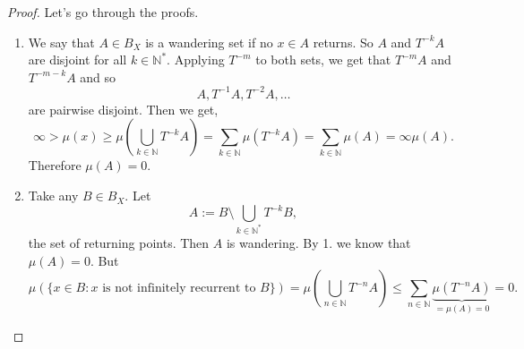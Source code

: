 \documentclass{article}
\newcommand*{\N}{\mathbb{N}}
\newcommand*{\Ns}{\N^*}
\begin{document}
\begin{proof}
    Let's go through the proofs.
    \begin{enumerate}
        \item We say that $A\in B_X$ is a wandering set if no $x\in A$ returns. So $A$ and $T^{-k}A$ are disjoint for all $k\in\Ns$. Applying $T^{-m}$ to both sets, we get that $T^{-m}A$ and $T^{-m-k}A$ and so
        $$A, T^{-1}A, T^{-2}A, \dots$$
        are pairwise disjoint. Then we get,
        $$\infty > \mu(x) \geq \mu\left(\bigcup_{k\in\N}T^{-k}A\right)=\sum_{k\in\N}\mu(T^{-k}A) = \sum_{k\in\N}\mu(A) = \infty\mu(A).$$
        Therefore $\mu(A) = 0$.

        \item Take any $B\in B_X$. Let
        $$A:= B\setminus\bigcup_{k\in\Ns}T^{-k}B,$$
        the set of returning points. Then $A$ is wandering. By 1. we know that $\mu(A)=0$. But
        $$\mu(\{x\in B: x \text{ is not infinitely recurrent to } B\}) = \mu\left(\bigcup_{n\in\N}T^{-n}A\right)\leq\sum_{n\in\N}\underbrace{\mu(T^{-n}A)}_{=\mu(A) = 0} = 0.$$
    \end{enumerate}
\end{proof}
\end{document}

